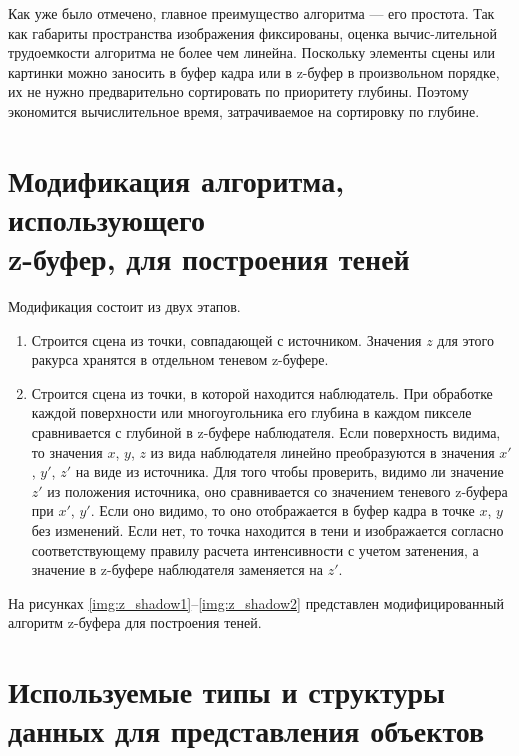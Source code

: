 \FloatBarrier

Как уже было отмечено, главное преимущество алгоритма --- его простота. Так как габариты пространства изображения фиксированы, оценка вычис-лительной трудоемкости алгоритма не более чем линейна. Поскольку элементы сцены или картинки можно заносить в буфер кадра или в z-буфер в произвольном порядке, их не нужно предварительно сортировать по приоритету глубины. Поэтому экономится вычислительное время, затрачиваемое на сортировку по глубине.

\section{Модификация алгоритма, использующего \\z-буфер, для построения теней}

Модификация состоит из двух этапов.
\begin{enumerate}[label=\arabic*)]
    \item Строится сцена из точки, совпадающей с источником. Значения $z$ для этого ракурса хранятся в отдельном теневом z-буфере.
    \item Строится сцена из точки, в которой находится наблюдатель. При обработке каждой поверхности или многоугольника его глубина в каждом пикселе сравнивается с глубиной в z-буфере наблюдателя. Если поверхность видима, то значения $x$, $y$, $z$ из вида наблюдателя линейно преобразуются в значения $x'$, $y'$, $z'$ на виде из источника. Для того чтобы проверить, видимо ли значение $z'$ из положения источника, оно сравнивается со значением теневого z-буфера при $x'$, $y'$. Если оно видимо, то оно отображается в буфер кадра в точке $x$, $y$ без изменений. Если нет, то точка находится в тени и изображается согласно соответствующему правилу расчета интенсивности с учетом затенения, а значение в z-буфере наблюдателя заменяется на $z'$.
\end{enumerate}

На рисунках \ref{img:z_shadow1}--\ref{img:z_shadow2} представлен модифицированный алгоритм z-буфера для построения теней.

\clearpage

\section{Используемые типы и структуры данных для представления объектов}

